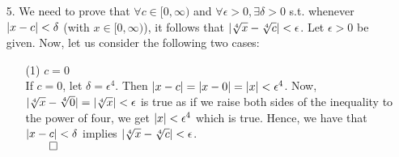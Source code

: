 \documentclass[11pt]{article}
\DeclarePairedDelimiter\abs{\lvert}{\rvert}%
\begin{document}
\begin{itemize}
\begin{itemize}
            \item[(b)]
                Per \textbf{Exercise 4.2.9 (b)} that I have completed as a part
                of the assignment, we can say $\lim_{x \to \infty} f(x) = L$ if
                $\forall \epsilon > 0, \exists M > 0$ s.t. if $x > M$ we have
                $\abs{f(x) - L} < \epsilon$. Let us now show that $\lim_{x \to
                \infty} \dfrac{2x}{x + 4} = 2$. Let $\epsilon > 0$ be given and
                let $M = \dfrac{8}{\epsilon}$. Then if $x > M$, we have
                $x > \dfrac{8}{\epsilon}$. We have
                $\dfrac{2x}{x + 4} =
                \abs{\dfrac{2 \frac{8}{\epsilon}}{\frac{8}{\epsilon} + 4}  - 2}
                = \dfrac{8}{\frac{8}{\epsilon} + 4} =
                \dfrac{2\epsilon}{\epsilon + 2} =
                \epsilon - \dfrac{4}{\epsilon + 2} < \epsilon$.\\
                Hence, $\lim_{x \to \infty} \dfrac{2x}{x + 4} = 2$.\\
                $\qed$
        \end{itemize}

    \item[5.]
        We need to prove that $\forall c \in [0, \infty)$ and
        $\forall \epsilon > 0, \exists \delta > 0$ s.t. whenever
        $\abs{x - c} < \delta$ (with $x \in [0, \infty)$), it follows that
        $\abs{\sqrt[4]{x} - \sqrt[4]{c}} < \epsilon$.
        Let $\epsilon > 0$ be given. Now, let us consider the following two
        cases:
        \begin{itemize}
            \item[(1)]
                $c = 0$\\
                If $c = 0$, let $\delta = \epsilon^4$. Then
                $\abs{x - c} = \abs{x - 0} = \abs{x} < \epsilon^4$.
                Now,
                $\abs{\sqrt[4]{x} - \sqrt[4]{0}} = \abs{\sqrt[4]{x}} < \epsilon$
                is true as if we raise both sides of the inequality to the
                power of four, we get $\abs{x} < \epsilon^4$ which is true.
                Hence, we have that $\abs{x - c} < \delta$ implies
                $\abs{\sqrt[4]{x} - \sqrt[4]{c}} < \epsilon$.\\
                $\qed$


\end{itemize}
\end{itemize}
\end{document}
